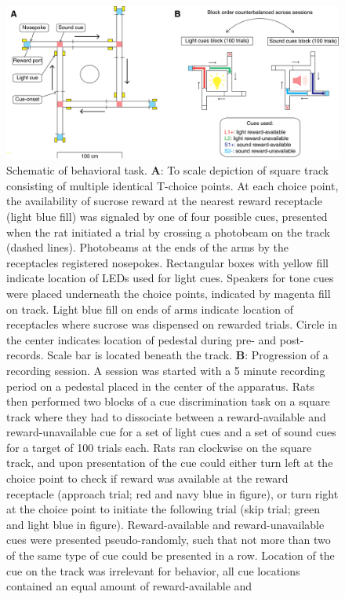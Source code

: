 \documentclass[11pt]{article}
\newcommand{\bsf}[1]{\textbf{#1}}
\begin{document}
\begin{figure}[h]
\centering
\includegraphics[width=\textwidth]{Fig 2 - Schematic task.png}
\caption{Schematic of behavioral task. \bsf{A}: To scale depiction of square
  track consisting of multiple identical T-choice points. At each choice point,
  the availability of sucrose reward at the nearest reward receptacle (light
  blue fill) was signaled by one of four possible cues, presented when the rat
  initiated a trial by crossing a photobeam on the track (dashed
  lines). Photobeams at the ends of the arms by the receptacles registered
  nosepokes. Rectangular boxes with yellow fill indicate location of LEDs used
  for light cues. Speakers for tone cues were placed underneath the choice
  points, indicated by magenta fill on track. Light blue fill on ends of arms
  indicate location of receptacles where sucrose was dispensed on rewarded
  trials. Circle in the center indicates location of pedestal during pre- and
  post-records. Scale bar is located beneath the track. \bsf{B}: Progression of
  a recording session. A session was started with a 5 minute recording period on
  a pedestal placed in the center of the apparatus. Rats then performed two
  blocks of a cue discrimination task on a square track where they had to
  dissociate between a reward-available and reward-unavailable cue for a set of
  light cues and a set of sound cues for a target of 100 trials each. Rats ran
  clockwise on the square track, and upon presentation of the cue could either
  turn left at the choice point to check if reward was available at the reward
  receptacle (approach trial; red and navy blue in figure), or turn right at the
  choice point to initiate the following trial (skip trial; green and light blue
  in figure). Reward-available and reward-unavailable cues were presented
  pseudo-randomly, such that not more than two of the same type of cue could be
  presented in a row. Location of the cue on the track was irrelevant for
  behavior, all cue locations contained an equal amount of reward-available and
}
\end{figure}
\end{document}
